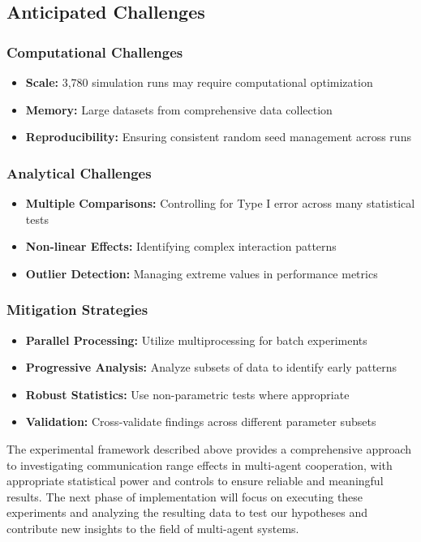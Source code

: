 \documentclass[12pt,a4paper]{article}
\begin{document}
\subsection{Anticipated Challenges}

\subsubsection{Computational Challenges}

\begin{itemize}
    \item \textbf{Scale:} 3,780 simulation runs may require computational optimization
    \item \textbf{Memory:} Large datasets from comprehensive data collection
    \item \textbf{Reproducibility:} Ensuring consistent random seed management across runs
\end{itemize}

\subsubsection{Analytical Challenges}

\begin{itemize}
    \item \textbf{Multiple Comparisons:} Controlling for Type I error across many statistical tests
    \item \textbf{Non-linear Effects:} Identifying complex interaction patterns
    \item \textbf{Outlier Detection:} Managing extreme values in performance metrics
\end{itemize}

\subsubsection{Mitigation Strategies}

\begin{itemize}
    \item \textbf{Parallel Processing:} Utilize multiprocessing for batch experiments
    \item \textbf{Progressive Analysis:} Analyze subsets of data to identify early patterns
    \item \textbf{Robust Statistics:} Use non-parametric tests where appropriate
    \item \textbf{Validation:} Cross-validate findings across different parameter subsets
\end{itemize}

The experimental framework described above provides a comprehensive approach to investigating communication range effects in multi-agent cooperation, with appropriate statistical power and controls to ensure reliable and meaningful results. The next phase of implementation will focus on executing these experiments and analyzing the resulting data to test our hypotheses and contribute new insights to the field of multi-agent systems.

\printbibliography
\end{document}
